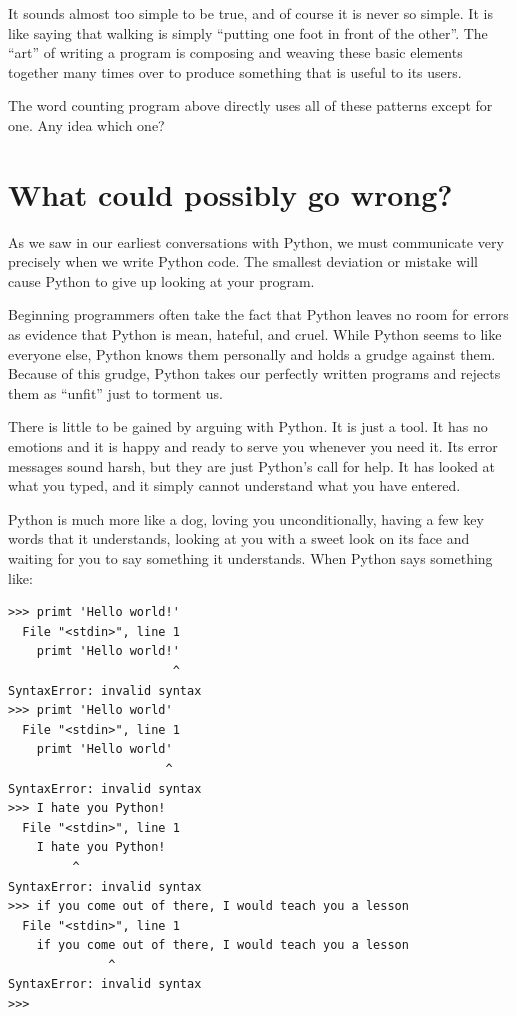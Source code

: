 It sounds almost too simple to be true, and of course it is never
so simple.  It is like saying that walking is simply
``putting one foot in front of the other''.  The ``art'' 
of writing a program is composing and weaving these
basic elements together many times over to produce something
that is useful to its users.

The word counting program above directly uses all of 
these patterns except for one. Any idea which one?

\section{What could possibly go wrong?}

As we saw in our earliest conversations with Python, we must
communicate very precisely when we write Python code.  The smallest
deviation or mistake will cause Python to give up looking at your
program.

Beginning programmers often take the fact that Python leaves no
room for errors as evidence that Python is mean, hateful, and cruel.
While Python seems to like everyone else, Python knows them 
personally and holds a grudge against them.  Because of this grudge,
Python takes our perfectly written programs and rejects them as 
``unfit'' just to torment us.

There is little to be gained by arguing with Python.  It is just a tool.
It has no emotions and it is happy and ready to serve you whenever you
need it.  Its error messages sound harsh, but they are just Python's
call for help.  It has looked at what you typed, and it simply cannot
understand what you have entered.

Python is much more like a dog, loving you unconditionally, having a few
key words that it understands, looking at you with a sweet look on its
face and waiting for you to say something it understands.
When Python says something like:

\beforeverb
\begin{verbatim}
>>> primt 'Hello world!'
  File "<stdin>", line 1
    primt 'Hello world!'
                       ^
SyntaxError: invalid syntax
>>> primt 'Hello world'
  File "<stdin>", line 1
    primt 'Hello world'
                      ^
SyntaxError: invalid syntax
>>> I hate you Python!
  File "<stdin>", line 1
    I hate you Python!
         ^
SyntaxError: invalid syntax
>>> if you come out of there, I would teach you a lesson
  File "<stdin>", line 1
    if you come out of there, I would teach you a lesson
              ^
SyntaxError: invalid syntax
>>> 
\end{verbatim}
\afterverb

